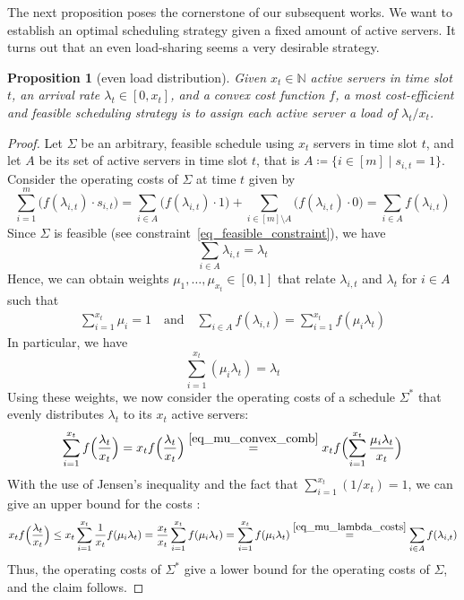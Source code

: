 \documentclass[hidelinks]{article}
\theoremstyle{plain}
\newtheorem{prop}[thm]{Proposition}
\theoremstyle{definition}
\theoremstyle{rem}
\begin{document}
The next proposition poses the cornerstone of our subsequent works. We want to establish an optimal scheduling strategy given a fixed amount of active servers. It turns out that an even load-sharing seems a very desirable strategy.
\begin{prop}[even load distribution]\label{prop_even_load_sharing}
Given $x_t\in\mathbb{N}$ active servers in time slot $t$, an arrival rate $\lambda_t\in[0,x_t]$, and a convex cost function $f$, a most cost-efficient and feasible scheduling strategy is to assign each active server a load of $\lambda_t/x_t$.
\end{prop}
\begin{proof}
Let $\Sigma$ be an arbitrary, feasible schedule using $x_t$ servers in time slot $t$, and let $A$ be its set of active servers in time slot $t$, that is $A\coloneqq\{i\in[m]\mid s_{i,t}=1\}$.
Consider the operating costs of $\Sigma$ at time $t$ given by
\begin{equation*}
	\sum\limits_{i=1}^{m}\bigl(f(\lambda_{i,t})\cdot s_{i,t}\bigr)=\sum\limits_{i\in A}\bigl(f(\lambda_{i,t})\cdot1\bigr)+\sum\limits_{i\in [m]\setminus A}\bigl(f(\lambda_{i,t})\cdot0\bigr)=\sum\limits_{i\in A}f(\lambda_{i,t})
\end{equation*}
Since $\Sigma$ is feasible (see constraint~\eqref{eq_feasible_constraint}), we have 
\begin{equation*}
	\sum\limits_{i\in A}\lambda_{i,t}=\lambda_t
\end{equation*}
Hence, we can obtain weights $\mu_1,\ldots,\mu_{x_t}\in[0,1]$ that relate $\lambda_{i,t}$ and $\lambda_t$ for $i\in A$ such that
\begin{align}
	\sum\limits_{i=1}^{x_t}\mu_i=1\quad\text{and}\quad \sum\limits_{i\in A}f(\lambda_{i,t})=\sum\limits_{i=1}^{x_t}f(\mu_i\lambda_t)\label{eq_mu_lambda_costs}
\end{align}
In particular, we have 
\begin{equation}
	\sum_{i=1}^{x_t}(\mu_i\lambda_t)=\lambda_t\label{eq_mu_convex_comb}
\end{equation}
Using these weights, we now consider the operating costs of a schedule $\Sigma^*$ that evenly distributes $\lambda_t$ to its $x_t$ active servers:
\begin{align*}
	\sum\limits_{i=1}^{x_t}f\Bigl(\frac{\lambda_t}{x_t}\Bigr)=x_tf\Bigl(\frac{\lambda_t}{x_t}\Bigr)\stackrel{\eqref{eq_mu_convex_comb}}{=}x_tf\Bigl(\sum\limits_{i=1}^{x_t}{\frac{\mu_i\lambda_t}{x_t}}\Bigr)
\end{align*}
With the use of Jensen's inequality and the fact that $\sum_{i=1}^{x_t}(1/x_t)=1$, we can give an upper bound for the costs :
\begin{align*}
	x_tf\Bigl(\frac{\lambda_t}{x_t}\Bigr)\le x_t\sum\limits_{i=1}^{x_t}\frac{1}{x_t}f(\mu_i\lambda_t)=\frac{x_t}{x_t}\sum\limits_{i=1}^{x_t}f(\mu_i\lambda_t)=\sum\limits_{i=1}^{x_t}f(\mu_i\lambda_t)\stackrel{\eqref{eq_mu_lambda_costs}}{=}\sum\limits_{i\in A}f(\lambda_{i,t})
\end{align*}
Thus, the operating costs of $\Sigma^*$ give a lower bound for the operating costs of $\Sigma$, and the claim follows.
\end{proof}
\end{document}
